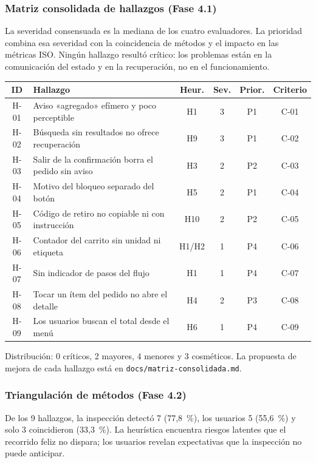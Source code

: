 \documentclass{article}
\begin{document}
\subsubsection{Matriz consolidada de hallazgos (Fase 4.1)}
La severidad consensuada es la mediana de los cuatro evaluadores. La prioridad combina esa severidad con la coincidencia de métodos y el impacto en las métricas ISO. Ningún hallazgo resultó crítico: los problemas están en la comunicación del estado y en la recuperación, no en el funcionamiento.

\begin{center}
\small
\begin{tabular}{|c|p{6.1cm}|c|c|c|c|}
\hline
\textbf{ID} & \textbf{Hallazgo} & \textbf{Heur.} & \textbf{Sev.} & \textbf{Prior.} & \textbf{Criterio} \\
\hline
H-01 & Aviso «agregado» efímero y poco perceptible & H1 & 3 & P1 & C-01 \\
\hline
H-02 & Búsqueda sin resultados no ofrece recuperación & H9 & 3 & P1 & C-02 \\
\hline
H-03 & Salir de la confirmación borra el pedido sin aviso & H3 & 2 & P2 & C-03 \\
\hline
H-04 & Motivo del bloqueo separado del botón & H5 & 2 & P1 & C-04 \\
\hline
H-05 & Código de retiro no copiable ni con instrucción & H10 & 2 & P2 & C-05 \\
\hline
H-06 & Contador del carrito sin unidad ni etiqueta & H1/H2 & 1 & P4 & C-06 \\
\hline
H-07 & Sin indicador de pasos del flujo & H1 & 1 & P4 & C-07 \\
\hline
H-08 & Tocar un ítem del pedido no abre el detalle & H4 & 2 & P3 & C-08 \\
\hline
H-09 & Los usuarios buscan el total desde el menú & H6 & 1 & P4 & C-09 \\
\hline
\end{tabular}
\end{center}

Distribución: 0 críticos, 2 mayores, 4 menores y 3 cosméticos. La propuesta de mejora de cada hallazgo está en \texttt{docs/matriz-consolidada.md}.

\subsubsection{Triangulación de métodos (Fase 4.2)}
De los 9 hallazgos, la inspección detectó 7 (77,8~\%), los usuarios 5 (55,6~\%) y solo 3 coincidieron (33,3~\%). La heurística encuentra riesgos latentes que el recorrido feliz no dispara; los usuarios revelan expectativas que la inspección no puede anticipar.
\end{document}
